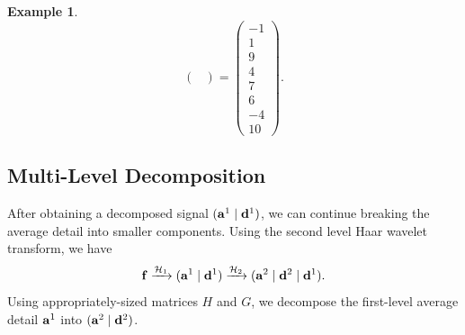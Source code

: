 \documentclass[12pt]{article}
\theoremstyle{definition}
\newtheorem{example}[definition]{Example}
\begin{document}
\begin{example}
\[\begin{pmatrix}
    \end{pmatrix} =
    \begin{pmatrix}
      -1 \\ 1 \\ 9 \\ 4 \\ 7 \\ 6 \\ -4 \\ 10
    \end{pmatrix}.\]
  \end{example}

  \subsection{Multi-Level Decomposition}
  After obtaining a decomposed signal \((\vb{a}^1 \mid \vb{d}^1)\), we can continue breaking the average detail into smaller components. Using the second level Haar wavelet transform, we have
  \begin{equation*}
    \vb{f} \xrightarrow{\mathcal{H}_1} (\vb{a}^1 \mid \vb{d}^1) \xrightarrow{\mathcal{H}_2} (\vb{a}^2 \mid \vb{d}^2 \mid \vb{d}^1).
  \end{equation*}
  Using appropriately-sized matrices \(H\) and \(G\), we decompose the first-level average detail \(\vb{a}^1\) into \((\vb{a}^2 \mid \vb{d}^2)\).

\end{document}
